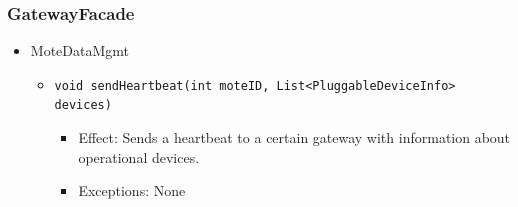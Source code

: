     \subsubsection{GatewayFacade}\label{add1-int-gatewayfacade}
        \begin{itemize}
            \item MoteDataMgmt
            \begin{itemize}
                \item \texttt{void sendHeartbeat(int moteID, List<PluggableDeviceInfo> devices)}
                \begin{itemize}
                    \item Effect: Sends a heartbeat to a certain gateway with information about operational devices.
                    \item Exceptions: None
                \end{itemize}
            \end{itemize}


\end{itemize}
